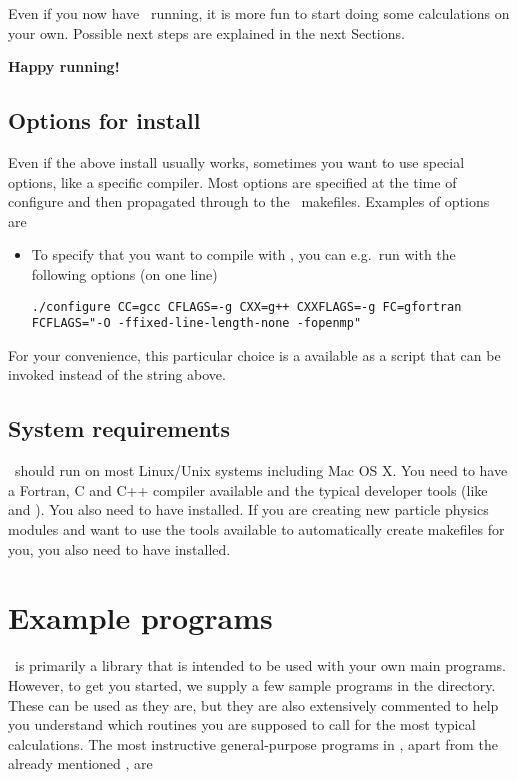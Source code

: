 \bigskip
Even if you now have \ds\ running, it is more fun to start doing some calculations on your own. Possible next steps are explained in 
the next Sections.

\bigskip
\centerline{\bfseries Happy running!}

\subsection{Options for install}
Even if the above install usually works, sometimes you want to use special options, like a specific compiler. Most options are specified at the time of configure and then propagated through to the \ds\ makefiles. Examples of options are
\begin{itemize}
\item To specify that you want to compile with , you can e.g.\ run  with the following options (on one line)
\begin{verbatim}
./configure CC=gcc CFLAGS=-g CXX=g++ CXXFLAGS=-g FC=gfortran
FCFLAGS="-O -ffixed-line-length-none -fopenmp"
\end{verbatim}
\end{itemize}
For your convenience, this particular choice is a available as a script  that can be invoked instead of the string above.


\subsection{System requirements}

\ds\ should run on most Linux/Unix systems including Mac OS X. You need to have a Fortran, C and C++ compiler available and the typical developer tools (like  and ). You also need to have  installed. If you are creating new particle physics modules and want to use the tools available to automatically create makefiles for you, you also need to have  installed.


\section{Example programs}



\ds\ is primarily a library that is intended to be used with your own main programs. However, to get you started, we supply a few sample programs in the  directory. These can be used as they are, but they are also extensively commented to help you understand which routines you are supposed to call for the most typical calculations. The most instructive general-purpose programs in , apart from the already 
mentioned , are

